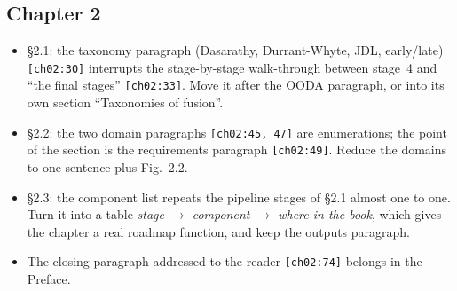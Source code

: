 \documentclass[10pt,a4paper]{article}
\newcommand{\src}[1]{{\footnotesize\texttt{[#1]}}}
\begin{document}
\subsection*{Chapter 2}
\begin{itemize}
\item \S2.1: the taxonomy paragraph (Dasarathy, Durrant-Whyte, JDL, early/late) \src{ch02:30} interrupts the stage-by-stage walk-through between stage~4 and ``the final stages'' \src{ch02:33}. Move it after the OODA paragraph, or into its own section ``Taxonomies of fusion''.
\item \S2.2: the two domain paragraphs \src{ch02:45, 47} are enumerations; the point of the section is the requirements paragraph \src{ch02:49}. Reduce the domains to one sentence plus Fig.~2.2.
\item \S2.3: the component list repeats the pipeline stages of \S2.1 almost one to one. Turn it into a table \emph{stage $\to$ component $\to$ where in the book}, which gives the chapter a real roadmap function, and keep the outputs paragraph.
\item The closing paragraph addressed to the reader \src{ch02:74} belongs in the Preface.
\end{itemize}
\end{document}
